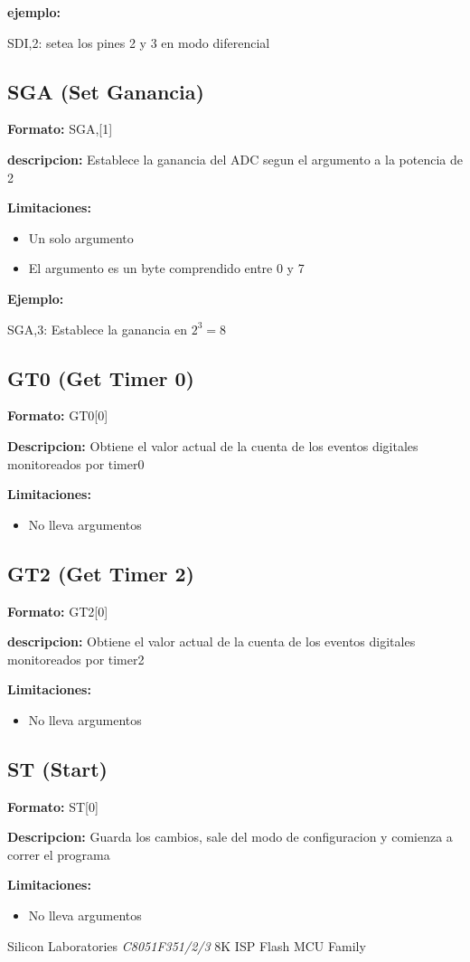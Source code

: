 \documentclass{article}
\theoremstyle{definition}
\theoremstyle{remark}
\begin{document}
\begin{appendices}
\textbf{ejemplo:}

SDI,2: setea los pines 2 y 3 en modo diferencial

\subsection{SGA (Set Ganancia)}

\textbf{Formato:} SGA,[1]

\textbf{descripcion:}
Establece la ganancia del ADC segun el argumento a la potencia de 2

\textbf{Limitaciones:}
\begin{itemize}
  \item Un solo argumento
  \item El argumento es un byte comprendido entre 0 y 7
\end{itemize}

\textbf{Ejemplo:}

SGA,3: Establece la ganancia en $2^{3} = 8$


\subsection{GT0 (Get Timer 0)}

\textbf{Formato:} GT0[0]

\textbf{Descripcion:}
Obtiene el valor actual de la cuenta de los eventos digitales monitoreados por timer0

\textbf{Limitaciones:}
\begin{itemize}
  \item No lleva argumentos


\end{itemize}\subsection{GT2 (Get Timer 2)}

\textbf{Formato:} GT2[0]

\textbf{descripcion:}
Obtiene el valor actual de la cuenta de los eventos digitales monitoreados por timer2

\textbf{Limitaciones:}
\begin{itemize}
  \item No lleva argumentos
\end{itemize}

\subsection{ST (Start)}

\textbf{Formato:} ST[0]

\textbf{Descripcion:}
Guarda los cambios, sale del modo de configuracion y comienza a correr el programa

\textbf{Limitaciones:}
\begin{itemize}
  \item No lleva argumentos
\end{itemize}

\end{appendices}
\begin{thebibliography}{99}

 Silicon Laboratories \emph{C8051F351/2/3} 8K ISP Flash MCU Family

\end{thebibliography}
\end{document}
